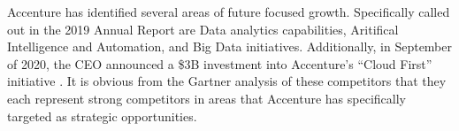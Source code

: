 Accenture has identified several areas of future focused growth. Specifically called out in the 2019 Annual Report are Data analytics capabilities, Aritifical Intelligence and Automation, and Big Data initiatives. Additionally, in September of 2020, the CEO announced a \$3B investment into Accenture's ``Cloud First'' initiative \parencite{AccenturePLC2019,AccentureCloudFirst2020}. It is obvious from the Gartner analysis \parencite[][see Figures 1-3]{gartnerinc.StrategicPlanning2020a} of these competitors that they each represent strong competitors in areas that Accenture has specifically targeted as strategic opportunities.
